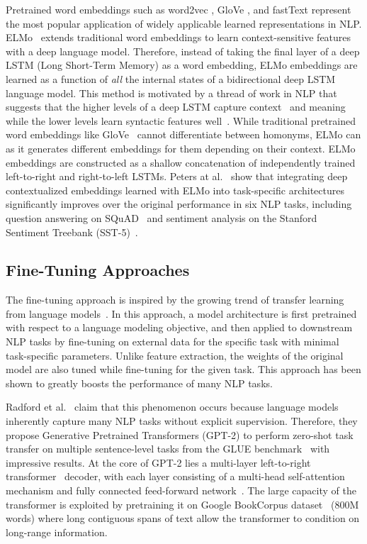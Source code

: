 Pretrained word embeddings such as word2vec \cite{mikolov2013distributed}, GloVe \cite{pennington2014glove}, and fastText \cite{bojanowski2017enriching} represent the most popular application of widely applicable learned representations in NLP.
ELMo~\cite{peters2018deep} extends traditional word embeddings to learn context-sensitive features with a deep language model.
Therefore, instead of taking the final layer of a deep LSTM (Long Short-Term Memory) as a word embedding, ELMo embeddings are learned as a function of \textit{all} the internal states of a bidirectional deep LSTM language model.
This method is motivated by a thread of work in NLP that suggests that the higher levels of a deep LSTM capture context~\cite{melamud2016context2vec} and meaning while the lower levels learn syntactic features well~\cite{belinkov2017neural}.
While traditional pretrained word embeddings like GloVe~\cite{pennington2014glove} cannot differentiate between homonyms, ELMo can as it generates different embeddings for them depending on their context.
ELMo embeddings are constructed as a shallow concatenation of independently trained left-to-right and right-to-left LSTMs.
Peters at al.~\cite{peters2018deep} show that integrating deep contextualized embeddings learned with ELMo into task-specific architectures significantly improves over the original performance in six NLP tasks, including question answering on SQuAD~\cite{rajpurkar2016squad} and sentiment analysis on the Stanford Sentiment Treebank (SST-5)~\cite{socher2013recursive}.

\subsection{Fine-Tuning Approaches}

The fine-tuning approach is inspired by the growing trend of transfer learning from language models~\cite{devlin2018bert}.
In this approach, a model architecture is first pretrained with respect to a language modeling objective, and then applied to downstream NLP tasks by fine-tuning on external data for the specific task with minimal task-specific parameters.
Unlike feature extraction, the weights of the original model are also tuned while fine-tuning for the given task.
This approach has been shown to greatly boosts the performance of many NLP tasks.

Radford et al.~\cite{radford2019language} claim that this phenomenon occurs because language models inherently capture many NLP tasks without explicit supervision.
Therefore, they propose Generative Pretrained Transformers (GPT-2) to perform zero-shot task transfer on multiple sentence-level tasks from the GLUE benchmark~\cite{wang2018glue} with impressive results.
At the core of GPT-2 lies a multi-layer left-to-right transformer~\cite{vaswani2017attention} decoder, with each layer consisting of a multi-head self-attention mechanism and fully connected feed-forward network~\cite{radford2018improving}.
The large capacity of the transformer is exploited by pretraining it on Google BookCorpus dataset~\cite{zhu2015aligning} (800M words) where long contiguous spans of text allow the transformer to condition on long-range information.

